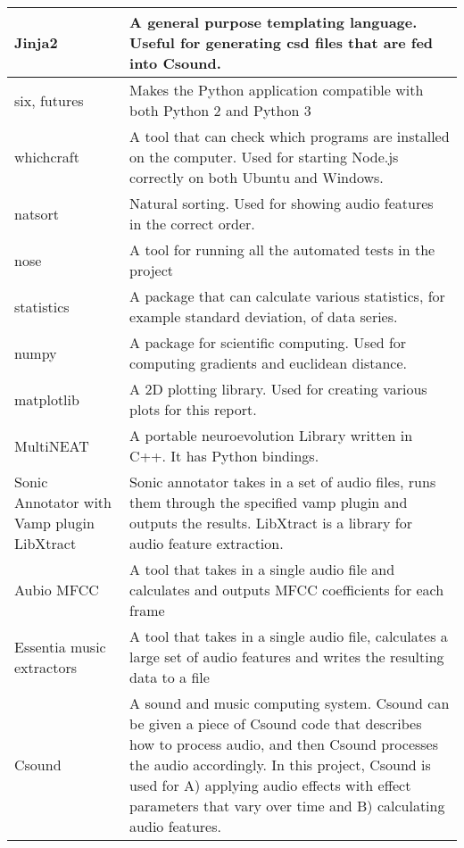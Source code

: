 \begin{center}
\begin{longtable}{p{3.3cm} p{13cm}}
\midrule
Jinja2 & A general purpose templating language. Useful for generating csd files that are fed into Csound. \\
\midrule
six, futures & Makes the Python application compatible with both Python 2 and Python 3 \\
\midrule
whichcraft & A tool that can check which programs are installed on the computer. Used for starting Node.js correctly on both Ubuntu and Windows. \\
\midrule
natsort & Natural sorting. Used for showing audio features in the correct order. \\
\midrule
nose & A tool for running all the automated tests in the project \\
\midrule
statistics & A package that can calculate various statistics, for example standard deviation, of data series. \\
\midrule
numpy & A package for scientific computing. Used for computing gradients and euclidean distance. \\
\midrule
matplotlib & A 2D plotting library. Used for creating various plots for this report. \\
\midrule
MultiNEAT & A portable neuroevolution Library written in C++. It has Python bindings. \\
\midrule
Sonic Annotator with Vamp plugin LibXtract & Sonic annotator takes in a set of audio files, runs them through the specified vamp plugin and outputs the results. LibXtract is a library for audio feature extraction. \\
\midrule
Aubio MFCC & A tool that takes in a single audio file and calculates and outputs MFCC coefficients for each frame \\
\midrule
Essentia music extractors & A tool that takes in a single audio file, calculates a large set of audio features and writes the resulting data to a file \\
\midrule
Csound & A sound and music computing system. Csound can be given a piece of Csound code that describes how to process audio, and then Csound processes the audio accordingly. In this project, Csound is used for A) applying audio effects with effect parameters that vary over time and B) calculating audio features. \\

\end{longtable}
\end{center}